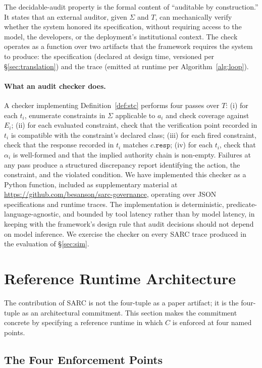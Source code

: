 \documentclass[11pt,a4paper]{article}
\theoremstyle{remark}
\begin{document}
The decidable-audit property is the formal content of ``auditable by construction.'' It states that an external auditor, given $\Sigma$ and $T$, can mechanically verify whether the system honored its specification, without requiring access to the model, the developers, or the deployment's institutional context. The check operates as a function over two artifacts that the framework requires the system to produce: the specification (declared at design time, versioned per \S\ref{sec:translation}) and the trace (emitted at runtime per Algorithm~\ref{alg:loop}).

\paragraph{What an audit checker does.} A checker implementing Definition~\ref{def:stc} performs four passes over $T$: (i) for each $t_i$, enumerate constraints in $\Sigma$ applicable to $a_i$ and check coverage against $E_i$; (ii) for each evaluated constraint, check that the verification point recorded in $t_i$ is compatible with the constraint's declared class; (iii) for each fired constraint, check that the response recorded in $t_i$ matches $c.\texttt{resp}$; (iv) for each $t_i$, check that $\alpha_i$ is well-formed and that the implied authority chain is non-empty. Failures at any pass produce a structured discrepancy report identifying the action, the constraint, and the violated condition. We have implemented this checker as a Python function, included as supplementary material at \url{https://github.com/besanson/sarc-governance}, operating over JSON specifications and runtime traces. The implementation is deterministic, predicate-language-agnostic, and bounded by tool latency rather than by model latency, in keeping with the framework's design rule that audit decisions should not depend on model inference. We exercise the checker on every SARC trace produced in the evaluation of \S\ref{sec:sim}.

\section{Reference Runtime Architecture}\label{sec:arch}

The contribution of SARC is not the four-tuple as a paper artifact; it is the four-tuple as an architectural commitment. This section makes the commitment concrete by specifying a reference runtime in which $C$ is enforced at four named points.

\subsection{The Four Enforcement Points}
\end{document}
